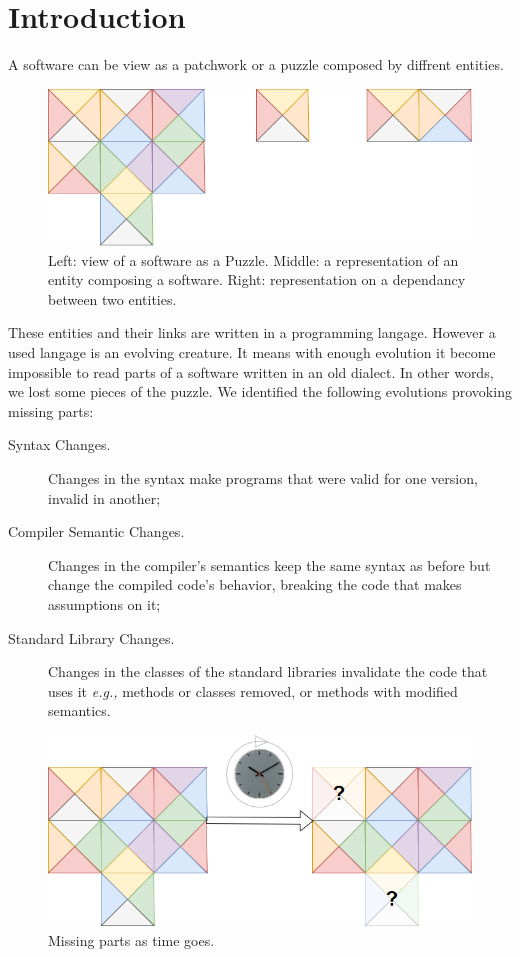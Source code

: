\documentclass[sigplan,review,anonymous]{acmart}\settopmatter{printfolios=true,printccs=false,printacmref=false}
\begin{document}
\section{Introduction}

A software can be view as a patchwork or a puzzle composed by diffrent entities.
	\begin{figure}[H]
       \centering
       \includegraphics[scale=0.25]{Images/SoftwareAsAPuzzle.png}
           \caption{Left: view of a software as a Puzzle. Middle: a representation of an entity composing a software. Right: representation on a dependancy between two entities.}
	\end{figure}	
These entities and their links are written in a programming langage. However a used langage is an evolving creature.
It means with enough evolution it become impossible to read parts of a software written in an old dialect.
In other words, we lost some pieces of the puzzle.
We identified the following evolutions provoking missing parts:
\begin{description}
    \item[Syntax Changes.] Changes in the syntax make programs that were valid for one version, invalid in another;
    \item[Compiler Semantic Changes.] Changes in the compiler's semantics keep the same syntax as before but change the compiled code's behavior, breaking the code that makes assumptions on it;
    \item[Standard Library Changes.] Changes in the classes of the standard libraries invalidate the code that uses it \textit{e.g.,} methods or classes removed, or methods with modified semantics.
\end{description}
	\begin{figure}[H]
       \centering
       \includegraphics[scale=0.25]{Images/MissingPartAsTimeGoes.png}
        \caption{Missing parts as time goes.}
	\end{figure}
	
\end{document}
